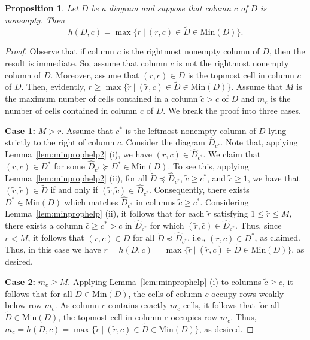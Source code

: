 \documentclass[letterpaper,10pt]{article}
\newtheorem{prop}[theorem]{Proposition}
\begin{document}
\begin{prop}\label{prop:highestcellmin}
    Let $D$ be a diagram and suppose that column $c$ of $D$ is nonempty. Then $$h(D,c)=\max\{r~|~(r,c)\in \tilde{D}\in\mathrm{Min}(D)\}.$$
\end{prop}
\begin{proof}
    Observe that if column $c$ is the rightmost nonempty column of $D$, then the result is immediate. So, assume that column $c$ is not the rightmost nonempty column of $D$. Moreover, assume that $(r,c)\in D$ is the topmost cell in column $c$ of $D$. Then, evidently, $r\ge \max\{\tilde{r}~|~(\tilde{r},c)\in \tilde{D}\in\mathrm{Min}(D)\}$. Assume that $M$ is the maximum number of cells contained in a column $\tilde{c}>c$ of $D$ and $m_c$ is the number of cells contained in column $c$ of $D$. We break the proof into three cases.
    \bigskip

    \noindent
    \textbf{Case 1:} $M>r$. Assume that $c^*$ is the leftmost nonempty column of $D$ lying strictly to the right of column $c$. Consider the diagram $\widehat{D}_{c^*}$. Note that, applying Lemma~\ref{lem:minprophelp2} (i), we have $(r,c)\in\widehat{D}_{c^*}$. We claim that $(r,c)\in D^*$ for some $\widehat{D}_{c^*}\succeq D^*\in \mathrm{Min}(D)$. To see this, applying Lemma~\ref{lem:minprophelp2} (ii), for all $\tilde{D}\preceq \widehat{D}_{c^*}$, $\tilde{c}\ge c^*$, and $\tilde{r}\ge 1$, we have that $(\tilde{r},\tilde{c})\in \tilde{D}$ if and only if $(\tilde{r},\tilde{c})\in \widehat{D}_{c^*}$. Consequently, there exists $D^*\in \mathrm{Min}(D)$ which matches $\widehat{D}_{c^*}$ in columns $\tilde{c}\ge c^*$. Considering Lemma~\ref{lem:minprophelp} (ii), it follows that for each $\tilde{r}$ satisfying $1\le \tilde{r}\le M$, there exists a column $\widehat{c}\ge c^*>c$ in $\widehat{D}_{c^*}$ for which $(\tilde{r},\widehat{c})\in\widehat{D}_{c^*}$. Thus, since $r<M$, it follows that $(r,c)\in \tilde{D}$ for all $\tilde{D}\preceq \widehat{D}_{c^*}$, i.e., $(r,c)\in D^*$, as claimed. Thus, in this case we have $r=h(D,c)=\max\{\tilde{r}~|~(\tilde{r},c)\in \tilde{D}\in\mathrm{Min}(D)\}$, as desired.
    \bigskip

    \noindent
    \textbf{Case 2:} $m_c\ge M$. Applying Lemma~\ref{lem:minprophelp} (i) to columns $\tilde{c}\ge c$, it follows that for all $\tilde{D}\in\mathrm{Min}(D)$, the cells of column $c$ occupy rows weakly below row $m_c$. As column $c$ contains exactly $m_c$ cells, it follows that for all $\tilde{D}\in\mathrm{Min}(D)$, the topmost cell in column $c$ occupies row $m_c$. Thus, $m_c=h(D,c)=\max\{\tilde{r}~|~(\tilde{r},c)\in \tilde{D}\in\mathrm{Min}(D)\}$, as desired.
    \bigskip


\end{proof}
\end{document}
